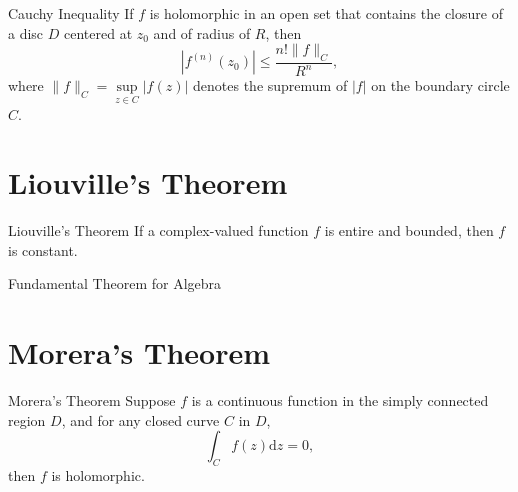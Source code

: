 \begin{corollary}{Cauchy Inequality}{}
  If $f$ is holomorphic in an open set that contains the closure of a disc $D$
  centered at $z_0$ and of radius of $R$, then
  \begin{equation}
    |f^{(n)}(z_0)| \leq \frac{n! \|f\|_C}{R^n},
  \end{equation}
  where $\|f\|_C = \sup \limits_{z \in C}|f(z)|$ denotes the supremum of $|f|$
  on the boundary circle $C$.
\end{corollary}

\section{Liouville's Theorem}

\begin{theorem}{Liouville's Theorem}{}
  If a complex-valued function $f$ is entire and bounded, then $f$ is constant.
\end{theorem}

\begin{corollary}{Fundamental Theorem for Algebra}{}
  
\end{corollary}


\section{Morera's Theorem}

\begin{theorem}{Morera's Theorem}{}
  Suppose $f$ is a continuous function in the simply connected region $D$,
  and for any closed curve $C$ in $D$,
  \begin{equation}
    \int_C f(z)\mathrm{d} z = 0,
  \end{equation}
  then $f$ is holomorphic.
\end{theorem}


